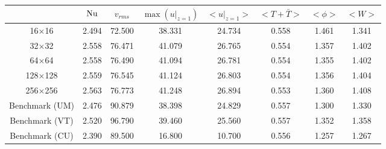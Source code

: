\begin{tabular}{c|ccccccc}
    & $\mathrm{Nu}$ & $v_{rms}$ & $\max(u|_{z=1})$ & $<u|_{z=1}>$ & $<T + \bar{T}>$ & $<\phi>$ & $<W>$ \\
\hline
16$\times$16 & 2.494 & 72.500 & 38.331 & 24.734 & 0.558 & 1.461 & 1.341 \\
32$\times$32 & 2.558 & 76.471 & 41.079 & 26.765 & 0.554 & 1.357 & 1.402 \\
64$\times$64 & 2.558 & 76.490 & 41.094 & 26.781 & 0.554 & 1.355 & 1.402 \\
128$\times$128 & 2.559 & 76.545 & 41.124 & 26.803 & 0.554 & 1.356 & 1.404 \\
256$\times$256 & 2.563 & 76.773 & 41.248 & 26.894 & 0.553 & 1.360 & 1.408 \\
\hline
Benchmark (UM) & 2.476 & 90.879 & 38.398 & 24.829 & 0.557 & 1.300 & 1.330 \\
Benchmark (VT) & 2.520 & 96.790 & 39.460 & 25.560 & 0.557 & 1.352 & 1.358 \\
Benchmark (CU) & 2.390 & 89.500 & 16.800 & 10.700 & 0.556 & 1.257 & 1.267 \\
\end{tabular}
